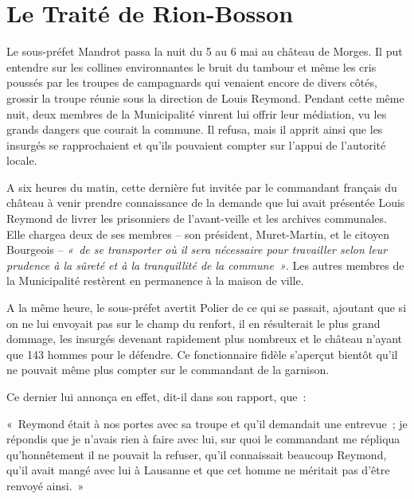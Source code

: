 \documentclass[french,twoside]{book} %
\newenvironment{quoteblock}%
  {\begin{quoting}}
  {\end{quoting}}
\newenvironment{quotebar}{%
    \def\FrameCommand{{\color{rubric!10!}\vrule width 0.5em} \hspace{0.9em}}%
    \def\OuterFrameSep{\itemsep} %
    \MakeFramed {\advance\hsize-\width \FrameRestore}
  }%
  {%
    \endMakeFramed
  }
\renewenvironment{quoteblock}%
  {%
    \savenotes
    \setstretch{0.9}
    \normalfont
    \begin{quotebar}
  }
  {%
    \end{quotebar}
    \spewnotes
  }
\begin{document}
\section[{Le Traité de Rion-Bosson}]{Le Traité de Rion-Bosson}
\noindent Le sous-préfet Mandrot passa la nuit du 5 au 6 mai au château de Morges. Il put entendre sur les collines environnantes le bruit du tambour et même les cris poussés par les troupes de campagnards qui venaient encore de divers côtés, grossir la troupe réunie sous la direction de Louis Reymond. Pendant cette même nuit, deux membres de la Municipalité vinrent lui offrir leur médiation, vu les grands dangers que courait la commune. Il refusa, mais il apprit ainsi que les insurgés se rapprochaient et qu’ils pouvaient compter sur l’appui de l’autorité locale.\par
A six heures du matin, cette dernière fut invitée par le commandant français du château à venir prendre connaissance de la demande que lui avait présentée Louis Reymond de livrer les prisonniers de l’avant-veille et les archives communales. Elle chargea deux de ses membres – son président, Muret-Martin, et le citoyen Bourgeois – \emph{« de se transporter où il sera nécessaire pour travailler selon leur prudence à la sûreté et à la tranquillité de la commune »}. Les autres membres de la Municipalité restèrent en permanence à la maison de ville.\par
A la même heure, le sous-préfet avertit Polier de ce qui se passait, ajoutant que si on ne lui envoyait pas sur le champ du renfort, il en résulterait le plus grand dommage, les insurgés devenant rapidement plus nombreux et le château n’ayant que 143 hommes pour le défendre. Ce fonctionnaire fidèle s’aperçut bientôt qu’il ne pouvait même plus compter sur le commandant de la garnison.\par
Ce dernier lui annonça en effet, dit-il dans son rapport, que :\par

\begin{quoteblock}
\noindent « Reymond était à nos portes avec sa troupe et qu’il demandait une entrevue ; je répondis que je n’avais rien à faire avec lui, sur quoi le commandant me répliqua qu’honnêtement il ne pouvait la refuser, qu’il connaissait beaucoup Reymond, qu’il avait mangé avec lui à Lausanne et que cet homme ne méritait pas d’être renvoyé ainsi. »\end{quoteblock}
\end{document}
